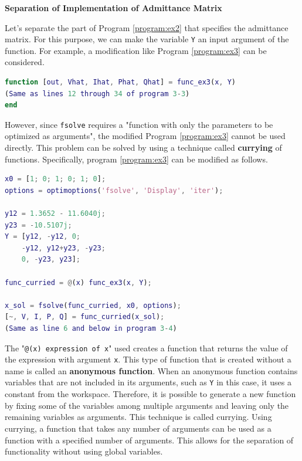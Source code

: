 \documentclass[graybox, envcountchap]{svmult}
\begin{document}
\begin{example}{\textbf{Separation of Implementation of Admittance Matrix}}

Let's separate the part of Program \ref{program:ex2} that specifies the
admittance matrix. For this purpose, we can make the variable \verb|Y| an input
argument of the function. For example, a modification like Program
\ref{program:ex3} can be considered.

\begin{lstlisting}[language=Matlab, caption=function\_ex2.m, label={program:ex3}]
function [out, Vhat, Ihat, Phat, Qhat] = func_ex3(x, Y)
(Same as lines 12 through 34 of program 3-3)
end
\end{lstlisting}

However, since \verb|fsolve| requires a "function with only the parameters to be
optimized as arguments", the modified Program \ref{program:ex3} cannot be used
directly. This problem can be solved by using a technique called
\textbf{currying} of functions. Specifically, program
\ref{program:ex3} can be modified as follows.


\begin{lstlisting}[language=Matlab, caption=main\_ex3.m, label={program:ex3_main}]
x0 = [1; 0; 1; 0; 1; 0];
options = optimoptions('fsolve', 'Display', 'iter');

y12 = 1.3652 - 11.6040j;
y23 = -10.5107j;
Y = [y12, -y12, 0;
    -y12, y12+y23, -y23;
    0, -y23, y23];

func_curried = @(x) func_ex3(x, Y);

x_sol = fsolve(func_curried, x0, options);
[~, V, I, P, Q] = func_curried(x_sol);
(Same as line 6 and below in program 3-4)
\end{lstlisting}

The "\verb|@(x) expression of x|" used creates a function that returns the value
of the expression with argument \verb|x|. This type of function that is created
without a name is called an \textbf{anonymous function}. When an anonymous
function contains variables that are not included in its arguments, such as
\verb|Y| in this case, it uses a constant from the workspace. Therefore, it is
possible to generate a new function by fixing some of the variables among
multiple arguments and leaving only the remaining variables as arguments. This
technique is called currying. Using currying, a function that takes any number
of arguments can be used as a function with a specified number of arguments.
This allows for the separation of functionality without using global variables.

\end{example}
\end{document}
